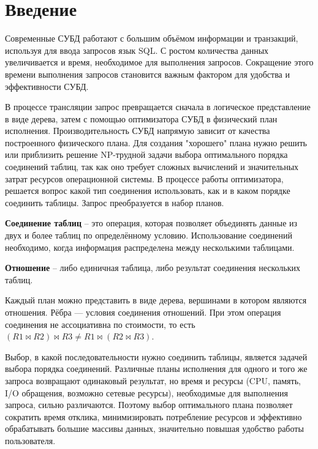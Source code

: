 \centering \section*{Введение}
\begin{flushleft}


Современные СУБД работают с большим объёмом информации и транзакций, используя для ввода запросов язык SQL. 
С ростом количества данных увеличивается и время, необходимое для выполнения запросов. 
Сокращение этого времени выполнения запросов становится важным фактором для удобства и эффективности СУБД. 
\newline

В процессе трансляции запрос превращается сначала в логическое представление в виде дерева, 
затем с помощью оптимизатора СУБД в физический план исполнения. Производительность СУБД напрямую зависит от качества
построенного физического плана. Для создания "хорошего" плана нужно решить или приблизить решение
NP-трудной задачи выбора оптимального порядка соединений таблиц, так как оно требует сложных вычислений и значительных затрат ресурсов операционной системы.
В процессе работы оптимизатора, решается вопрос какой тип соединения использовать, как и в каком порядке соединить таблицы. Запрос преобразуется в набор планов.
\newline

\textbf{Соединение таблиц} -- это операция, которая позволяет объединять данные
из двух и более таблиц по определённому условию. Использование соединений необходимо,
когда информация распределена между несколькими таблицами.
\newline

\textbf{Отношение} -- либо единичная таблица, либо результат соединения нескольких таблиц.
\newline

Каждый план можно представить в виде дерева, вершинами в котором являются отношения. Рёбра — условия соединения отношений.
При этом операция соединения не ассоциативна по стоимости, то есть
$(R1 \Join R2) \Join R3 \neq R1 \Join (R2 \Join  R3)$.
\newline

Выбор, в какой последовательности нужно соединить таблицы, является задачей выбора 
порядка соединений. Различные планы исполнения для одного и того же запроса возвращают 
одинаковый результат, но время и ресурсы (CPU, память, I/O обращения, возможно 
сетевые ресурсы), необходимые для выполнения запроса, сильно различаются. Поэтому 
выбор оптимального плана позволяет сократить время отклика, минимизировать 
потребление ресурсов и эффективно обрабатывать большие массивы данных, значительно 
повышая удобство работы пользователя.
\newline


\end{flushleft}

